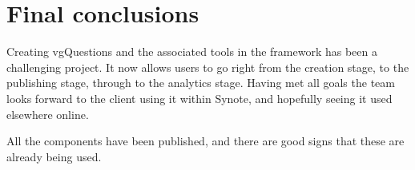 \section{Final conclusions}

Creating \gls{vgQuestions} and the associated tools in the framework has been a challenging project. It now allows users to go right from the creation
stage, to the publishing stage, through to the analytics stage. Having met all goals the team looks forward to the client using it within Synote, and hopefully seeing it used elsewhere online.

All the components have been published, and there are good signs that these are already being used.


